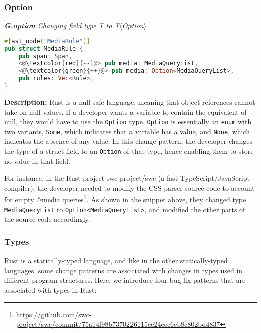 \subsubsection{Option}
\vspace{3mm}

\noindent\textit{\textbf{G.option} Changing field type T to T$\langle$Option$\rangle$}

\begin{lstlisting}[language=Rust, style=colouredRust]
#[ast_node("MediaRule")]
pub struct MediaRule {
    pub span: Span,
    <@\textcolor{red}{--}@> pub media: MediaQueryList,
    <@\textcolor{green}{++}@> pub media: Option<MediaQueryList>,
    pub rules: Vec<Rule>,
}

\end{lstlisting}

\noindent\textbf{Description:} Rust is a null-safe language, meaning that object references cannot take on null values. If a developer wants a variable to contain the equivalent of null, they would have to use the \texttt{Option} type. \texttt{Option} is essentially an \texttt{enum} with two variants, \texttt{Some}, which indicates that a variable has a value, and \texttt{None}, which indicates the absence of any value. In this change pattern, the developer changes the type of a struct field to an \texttt{Option} of that type, hence enabling them to store no value in that field.

For instance, in the Rust project swc-project/swc (a fast TypeScript/JavaScript compiler), the developer needed to modify the CSS parser source code to account for empty @media queries\footnote{\scriptsize \url{https://github.com/swc-project/swc/commit/75a14f98b7370226115ee24eec6eb8c802bd4837}}. As shown in the snippet above, they changed type \texttt{MediaQueryList} to \verb+Option<MediaQueryList>+, and modified the other parts of the source code accordingly.


\subsubsection{Types}

Rust is a statically-typed language, and like in the other statically-typed languages, some change patterns are associated with changes in types used in different program structures. Here, we introduce four bug fix patterns that are associated with types in Rust:

\vspace{3mm}

